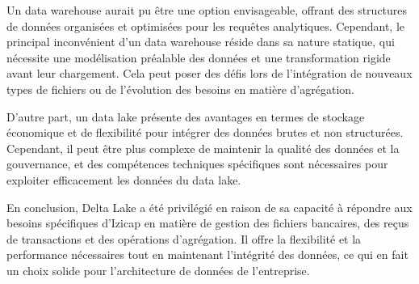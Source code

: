 Un data warehouse aurait pu être une option envisageable, offrant des structures de données organisées et optimisées pour les requêtes analytiques. Cependant, le principal inconvénient d'un data warehouse réside dans sa nature statique, qui nécessite une modélisation préalable des données et une transformation rigide avant leur chargement. Cela peut poser des défis lors de l'intégration de nouveaux types de fichiers ou de l'évolution des besoins en matière d'agrégation.

D'autre part, un data lake présente des avantages en termes de stockage économique et de flexibilité pour intégrer des données brutes et non structurées. Cependant, il peut être plus complexe de maintenir la qualité des données et la gouvernance, et des compétences techniques spécifiques sont nécessaires pour exploiter efficacement les données du data lake.

En conclusion, Delta Lake a été privilégié en raison de sa capacité à répondre aux besoins spécifiques d'Izicap en matière de gestion des fichiers bancaires, des reçus de transactions et des opérations d'agrégation. Il offre la flexibilité et la performance nécessaires tout en maintenant l'intégrité des données, ce qui en fait un choix solide pour l'architecture de données de l'entreprise.